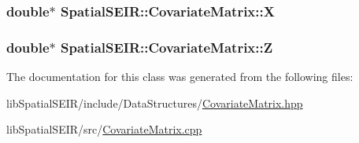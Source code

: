 \hypertarget{classSpatialSEIR_1_1CovariateMatrix_a1db364bb68f755ff8fc15844ae429716}{
\subsubsection[{X}]{\setlength{\rightskip}{0pt plus 5cm}double$\ast$ Spatial\-S\-E\-I\-R\-::\-Covariate\-Matrix\-::\-X}}\label{classSpatialSEIR_1_1CovariateMatrix_a1db364bb68f755ff8fc15844ae429716}
\hypertarget{classSpatialSEIR_1_1CovariateMatrix_a148a63e712e2a3fabc928615e24acd78}{
\subsubsection[{Z}]{\setlength{\rightskip}{0pt plus 5cm}double$\ast$ Spatial\-S\-E\-I\-R\-::\-Covariate\-Matrix\-::\-Z}}\label{classSpatialSEIR_1_1CovariateMatrix_a148a63e712e2a3fabc928615e24acd78}


The documentation for this class was generated from the following files\-:\begin{DoxyCompactItemize}
\item 
lib\-Spatial\-S\-E\-I\-R/include/\-Data\-Structures/\hyperlink{CovariateMatrix_8hpp}{Covariate\-Matrix.\-hpp}\item 
lib\-Spatial\-S\-E\-I\-R/src/\hyperlink{CovariateMatrix_8cpp}{Covariate\-Matrix.\-cpp}\end{DoxyCompactItemize}
